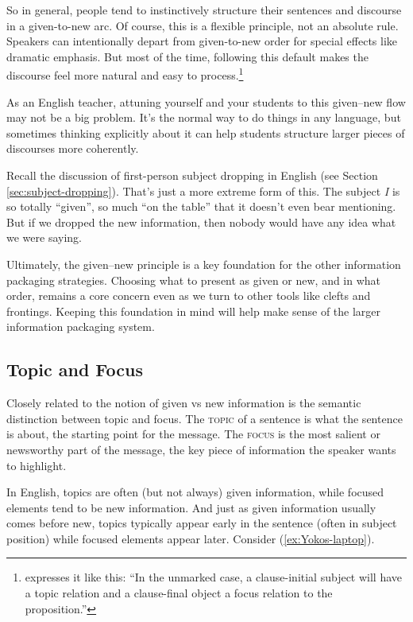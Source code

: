 So in general, people tend to instinctively structure their sentences and discourse in a given-to-new arc. Of course, this is a flexible principle, not an absolute rule. Speakers can intentionally depart from given-to-new order for special effects like dramatic emphasis. But most of the time, following this default makes the discourse feel more natural and easy to process.\footnote{\citet[16]{Lambrecht1994} expresses it like this: ``In the unmarked case, a clause-initial subject will have a topic relation and a clause-final object a focus relation to the proposition.''}

As an English teacher, attuning yourself and your students to this given--new flow may not be a big problem. It's the normal way to do things in any language, but sometimes thinking explicitly about it can help students structure larger pieces of discourses more coherently.

Recall the discussion of first-person subject dropping in English (see Section \ref{sec:subject-dropping}). That's just a more extreme form of this. The subject \textit{I} is so totally ``given'', so much ``on the table'' that it doesn't even bear mentioning. But if we dropped the new information, then nobody would have any idea what we were saying.

Ultimately, the given--new principle is a key foundation for the other information packaging strategies. Choosing what to present as given or new, and in what order, remains a core concern even as we turn to other tools like clefts and frontings. Keeping this foundation in mind will help make sense of the larger information packaging system.

\subsection{Topic and Focus} \label{sec:topic+focus}

Closely related to the notion of given vs new information is the semantic distinction between topic and focus. The \textsc{topic} of a sentence is what the sentence is about, the starting point for the message. The \textsc{focus} is the most salient or newsworthy part of the message, the key piece of information the speaker wants to highlight.

In English, topics are often (but not always) given information, while focused elements tend to be new information. And just as given information usually comes before new, topics typically appear early in the sentence (often in subject position) while focused elements appear later. Consider (\ref{ex:Yokos-laptop}).

